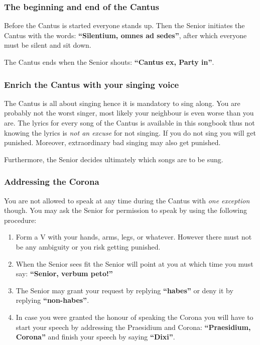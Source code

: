 \subsubsection*{The beginning and end of the Cantus}
Before the Cantus is started everyone stands up. Then the Senior initiates the Cantus with the words: \textbf{``Silentium, omnes ad sedes''}, after which everyone must be silent and sit down.

The Cantus ends when the Senior shouts: \textbf{``Cantus ex, Party in''}.

\subsubsection*{Enrich the Cantus with your singing voice}
The Cantus is all about singing hence it is mandatory to sing along. You are probably not the worst singer, most likely your neighbour is even worse than you are.
The lyrics for every song of the Cantus is available in this songbook thus not knowing the lyrics is \emph{not an excuse} for not singing.
If you do not sing you will get punished. Moreover, extraordinary bad singing may also get punished.

Furthermore, the Senior decides ultimately which songs are to be sung.

\subsubsection*{Addressing the Corona}
You are not allowed to speak at any time during the Cantus with \emph{one exception} though. You may ask the Senior for permission to speak by using the following procedure:
\begin{enumerate}
        \item Form a V with your hands, arms, legs, or whatever. However there must not be any ambiguity or you risk getting punished.
        \item When the Senior sees fit the Senior will point at you at which time you must say: \textbf{``Senior, verbum peto!''}
        \item The Senior may grant your request by replying \textbf{``habes''} or deny it by replying \textbf{``non-habes''}.
        \item In case you were granted the honour of speaking the Corona you will have to start your speech by addressing the Praesidium and Corona: \textbf{``Praesidium, Corona''} and finish your speech by saying \textbf{``Dixi''}.
\end{enumerate}

